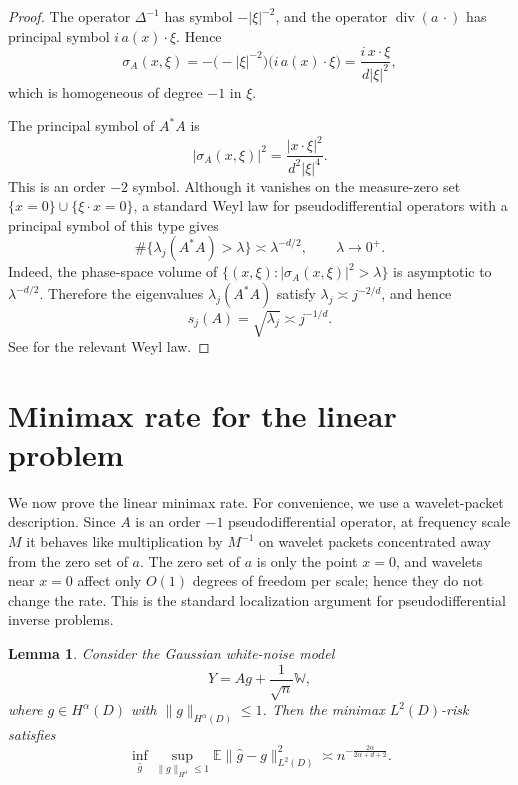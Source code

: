 \documentclass[11pt]{article}
\newcommand{\E}{\mathbb{E}}
\newtheorem{lemma}[theorem]{Lemma}
\theoremstyle{remark}
\begin{document}
\begin{proof}
The operator \(\Delta^{-1}\) has symbol \(-|\xi|^{-2}\), and the operator \(\operatorname{div}(a\,\cdot)\) has principal symbol \(i\,a(x)\cdot\xi\). Hence
\[
\sigma_A(x,\xi)=-\bigl(-|\xi|^{-2}\bigr)\bigl(i\,a(x)\cdot\xi\bigr)
=\frac{i\,x\cdot\xi}{d|\xi|^2},
\]
which is homogeneous of degree \(-1\) in \(\xi\). 

The principal symbol of \(A^*A\) is
\[
|\sigma_A(x,\xi)|^2=\frac{|x\cdot\xi|^2}{d^2|\xi|^4}.
\]
This is an order \(-2\) symbol. Although it vanishes on the measure-zero set \(\{x=0\}\cup\{\xi\cdot x=0\}\), a standard Weyl law for pseudodifferential operators with a principal symbol of this type gives
\[
\#\{\lambda_j(A^*A)>\lambda\}\asymp \lambda^{-d/2},\qquad \lambda\to0^+.
\]
Indeed, the phase-space volume of \(\{(x,\xi):|\sigma_A(x,\xi)|^2>\lambda\}\) is asymptotic to \(\lambda^{-d/2}\). Therefore the eigenvalues \(\lambda_j(A^*A)\) satisfy \(\lambda_j\asymp j^{-2/d}\), and hence
\[
s_j(A)=\sqrt{\lambda_j}\asymp j^{-1/d}.
\]
See \cite[Chapter 29]{hormander1985} for the relevant Weyl law.
\end{proof}

\section{Minimax rate for the linear problem}

We now prove the linear minimax rate. For convenience, we use a wavelet-packet description. Since \(A\) is an order \(-1\) pseudodifferential operator, at frequency scale \(M\) it behaves like multiplication by \(M^{-1}\) on wavelet packets concentrated away from the zero set of \(a\). The zero set of \(a\) is only the point \(x=0\), and wavelets near \(x=0\) affect only \(O(1)\) degrees of freedom per scale; hence they do not change the rate. This is the standard localization argument for pseudodifferential inverse problems.

\begin{lemma}\label{lem:linear-rate}
Consider the Gaussian white-noise model
\[
Y=A g+\frac1{\sqrt n}\mathbb W,
\]
where \(g\in H^\alpha(D)\) with \(\|g\|_{H^\alpha(D)}\le1\). Then the minimax \(L^2(D)\)-risk satisfies
\[
\inf_{\hat g}\sup_{\|g\|_{H^\alpha}\le1}
\E\|\hat g-g\|_{L^2(D)}^2
\asymp n^{-\frac{2\alpha}{2\alpha+d+2}}.
\]
\end{lemma}
\end{document}
